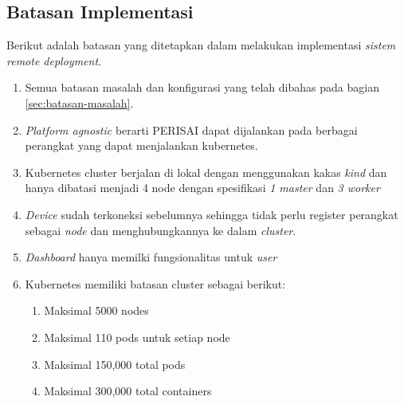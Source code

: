 \subsection{Batasan Implementasi}
Berikut adalah batasan yang ditetapkan dalam melakukan implementasi \textit{sistem remote deployment}.

\begin{enumerate}
  \item Semua batasan masalah dan konfigurasi yang telah dibahas pada bagian \ref{sec:batasan-masalah}.
  \item \textit{Platform agnostic} berarti PERISAI dapat dijalankan pada berbagai perangkat yang dapat menjalankan kubernetes.
  \item Kubernetes cluster berjalan di lokal dengan menggunakan kakas \textit{kind} dan hanya dibatasi menjadi 4 node dengan spesifikasi \textit{1 master} dan \textit{3 worker}
  \item \textit{Device} sudah terkoneksi sebelumnya sehingga tidak perlu register perangkat sebagai \textit{node} dan menghubungkannya ke dalam \textit{cluster}.
  \item \textit{Dashboard} hanya memilki fungsionalitas untuk \textit{user}
  \item Kubernetes memiliki batasan cluster sebagai berikut:
        \begin{enumerate}
          \item Maksimal 5000 nodes
          \item Maksimal 110 pods untuk setiap node
          \item Maksimal 150,000 total pods
          \item Maksimal 300,000 total containers
        \end{enumerate}
\end{enumerate}
